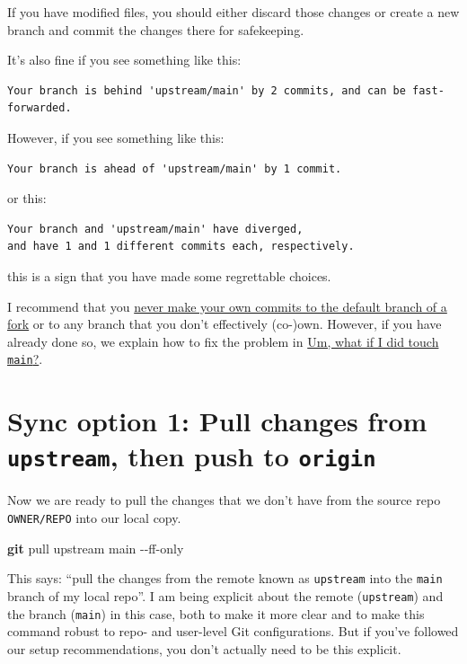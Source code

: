 \documentclass[
]{book}
\newenvironment{Shaded}{\begin{snugshade}}{\end{snugshade}}
\newcommand{\AttributeTok}[1]{\textcolor[rgb]{0.13,0.29,0.53}{#1}}
\newcommand{\FunctionTok}[1]{\textcolor[rgb]{0.13,0.29,0.53}{\textbf{#1}}}
\newcommand{\NormalTok}[1]{#1}
\begin{document}
If you have modified files, you should either discard those changes or create a new branch and commit the changes there for safekeeping.

It's also fine if you see something like this:

\begin{verbatim}
Your branch is behind 'upstream/main' by 2 commits, and can be fast-forwarded.
\end{verbatim}

However, if you see something like this:

\begin{verbatim}
Your branch is ahead of 'upstream/main' by 1 commit.
\end{verbatim}

or this:

\begin{verbatim}
Your branch and 'upstream/main' have diverged,
and have 1 and 1 different commits each, respectively.
\end{verbatim}

this is a sign that you have made some regrettable choices.

I recommend that you \hyperref[fork-dont-touch-main]{never make your own commits to the default branch of a fork} or to any branch that you don't effectively (co-)own.
However, if you have already done so, we explain how to fix the problem in \hyperref[touched-main]{Um, what if I did touch \texttt{main}?}.

\section{\texorpdfstring{Sync option 1: Pull changes from \texttt{upstream}, then push to \texttt{origin}}{Sync option 1: Pull changes from upstream, then push to origin}}\label{sync-option-1-pull-changes-from-upstream-then-push-to-origin}

Now we are ready to pull the changes that we don't have from the source repo \texttt{OWNER/REPO} into our local copy.

\begin{Shaded}
\begin{Highlighting}[]
\FunctionTok{git}\NormalTok{ pull upstream main }\AttributeTok{{-}{-}ff{-}only}
\end{Highlighting}
\end{Shaded}

This says: ``pull the changes from the remote known as \texttt{upstream} into the \texttt{main} branch of my local repo''.
I am being explicit about the remote (\texttt{upstream}) and the branch (\texttt{main}) in this case, both to make it more clear and to make this command robust to repo- and user-level Git configurations.
But if you've followed our setup recommendations, you don't actually need to be this explicit.
\end{document}
